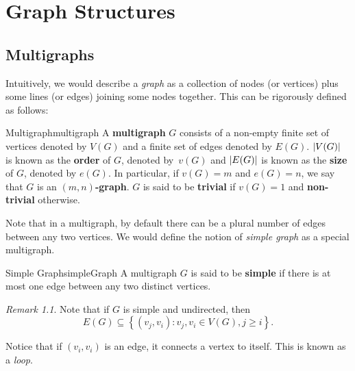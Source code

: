 \documentclass[math, code]{amznotes}
\theoremstyle{remark}
\newtheorem*{remark}{Remark}
\begin{document}
\tableofcontents

\chapter{Graph Structures}
\section{Multigraphs}
Intuitively, we would describe a \textit{graph} as a collection of nodes (or vertices) plus some lines (or edges) joining some nodes together. This can be rigorously defined as follows:
\begin{dfnbox}{Multigraph}{multigraph}
    A {\color{red} \textbf{multigraph}} $G$ consists of a non-empty finite set of vertices denoted by $V(G)$ and a finite set of edges denoted by $E(G)$. ${\left\lvert {V(G)} \right\rvert}$ is known as the {\color{red} \textbf{order}} of $G$, denoted by~$v(G)$ and ${\left\lvert {E(G)} \right\rvert}$ is known as the {\color{red} \textbf{size}} of $G$, denoted by $e(G)$. In particular, if $v(G) = m$ and $e(G) = n$, we say that $G$ is an {\color{red} \textbf{$(m, n)$-graph}}. $G$ is said to be {\color{red} \textbf{trivial}} if $v(G) = 1$ and {\color{red} \textbf{non-trivial}} otherwise.
\end{dfnbox}
Note that in a multigraph, by default there can be a plural number of edges between any two vertices. We would define the notion of \textit{simple graph} as a special multigraph.
\begin{dfnbox}{Simple Graph}{simpleGraph}
    A multigraph $G$ is said to be {\color{red} \textbf{simple}} if there is at most one edge between any two distinct vertices.
\end{dfnbox}
\begin{notebox}
    \begin{remark}
        Note that if $G$ is simple and undirected, then
        \begin{displaymath}
            E(G) \subseteq \left\{(v_j, v_i) \colon v_j, v_i \in V(G), j \geq i\right\}.
        \end{displaymath}
    \end{remark}
\end{notebox}
Notice that if $(v_i, v_i)$ is an edge, it connects a vertex to itself. This is known as a \textit{loop}.
\end{document}
